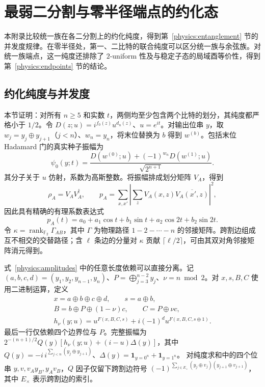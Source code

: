 \section{最弱二分割与零半径端点的约化态}
\label{physics:appendix}

本附录比较统一族在各二分割上的约化纯度，得到第~\ref{physics:entanglement} 节的并发度规律。在零半径处，第一、二比特的联合纯度可以区分统一族与余弦族。对统一族端点，这一纯度还排除了 $2$-uniform 性及与稳定子态的局域酉等价性，得到第~\ref{physics:endpoints} 节的结论。

\subsection{约化纯度与并发度}
\label{physics:app-purity}

本节证明：对所有 $n\ge5$ 和实数 $t$，两侧均至少包含两个比特的划分，其纯度都严格小于 $1/2$。令 $D(z;u)=i^{f_0(z)}u^{d_n(z)}$、$u=e^{it}$。对输出位串 $y$，取 $w_j=y_j\oplus y_{j+1}$（$j<n$）、$w_n=y_n$，将末位替换为 $b$ 得到 $w^{(b)}$。包括末位 Hadamard 门的真实种子振幅为
\begin{equation}
 \psi_0(y;t)=\frac{D(w^{(0)};u)+(-1)^{w_n}D(w^{(1)};u)}{\sqrt{2^{n+1}}}.
 \label{physics:amplitudes}
\end{equation}
其分子关于 $u$ 仿射，系数为高斯整数。将振幅排成划分矩阵 $V_A$，得到
\begin{equation}
 \rho_A=V_AV_A^\dagger,\qquad
 p_A=\sum_{x,x'}\left|\sum_zV_A(x,z)\overline{V_A(x',z)}\right|^2,
 \label{physics:finite-purity}
\end{equation}
因此具有精确的有理系数表达式
\begin{equation}
 p_A(t)=a_0+a_1\cos t+b_1\sin t+a_2\cos2t+b_2\sin2t.
 \label{physics:fourier-purity}
\end{equation}
令 $\kappa=\operatorname{rank}_{\mathbb F_2}\Gamma_{AB}$，其中 $\Gamma$ 为物理路径 $1-2-\cdots-n$ 的邻接矩阵。跨割边组成互不相交的交替路径；含 $\ell$ 条边的分量对 $\kappa$ 贡献 $\lceil\ell/2\rceil$，可由其双对角邻接矩阵消元得到。

式~\eqref{physics:amplitudes} 中的任意长度依赖可以直接分离。记 $(a,b,c,d)=(y_1,y_2,y_{n-1},y_n)$、$P=\bigoplus_{j=3}^{n-2}y_j$、$\nu=n\bmod2$。对 $x,s,B,C$ 使用二进制运算，定义
\begin{equation}
 \begin{gathered}
 x=a\oplus b\oplus c\oplus d,\qquad s=a\oplus b,\\
 B=b\oplus P\oplus(1-\nu)c,\qquad C=P\oplus\nu c,\\
 h_\nu(y;u)=u^{F(x,B,C,s)}+i(-1)^d u^{F(x,B,C,s\oplus1)}.
 \end{gathered}
 \label{physics:boundary-amplitude}
\end{equation}
最后一行仅依赖四个边界位与 $P$。完整振幅为 $2^{-(n+1)/2}Q(y)[h_\nu(y;u)+(i-u)\Delta(y)]$，其中 $Q(y)=-i\,i^{\sum_{j<n}(y_j\oplus y_{j+1})}$、$\Delta(y)=\mathbf1_{y=0^n}+\mathbf1_{y=1^n}$。
对纯度求和中的四个位串 $y,v,v_Ay_B,y_Av_B$，$Q$ 因子仅留下跨割边符号 $(-1)^{\sum_{j\in E_\times}(y_j\oplus v_j)(y_{j+1}\oplus v_{j+1})}$，其中 $E_\times$ 表示跨割边的索引。

